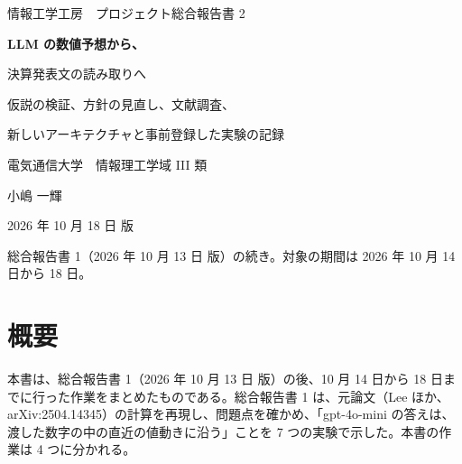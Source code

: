 \documentclass[xelatex,ja=standard,jafont=haranoaji,a4paper,10pt]{bxjsreport}
\begin{document}
\begin{titlepage}
\centering
\vspace*{30mm}
{\sffamily\Large 情報工学工房　プロジェクト総合報告書 2\par}
\vspace{14mm}
{\sffamily\bfseries\huge LLM の数値予想から、\par\vspace{3mm}決算発表文の読み取りへ\par}
\vspace{12mm}
{\large 仮説の検証、方針の見直し、文献調査、\par\vspace{2mm}新しいアーキテクチャと事前登録した実験の記録\par}
\vspace{30mm}
{\large 電気通信大学　情報理工学域 III 類\par}
\vspace{3mm}
{\Large 小嶋 一輝\par}
\vspace{20mm}
{\large 2026 年 10 月 18 日 版\par}
\vfill
{\small 総合報告書 1（2026 年 10 月 13 日 版）の続き。対象の期間は 2026 年 10 月 14 日から 18 日。\par}
\end{titlepage}
\hypersetup{pageanchor=true}

\chapter*{概要}

本書は、総合報告書 1（2026 年 10 月 13 日 版）の後、10 月 14 日から 18 日までに行った作業をまとめたものである。総合報告書 1 は、元論文（Lee ほか、arXiv:2504.14345）の計算を再現し、問題点を確かめ、「gpt-4o-mini の答えは、渡した数字の中の直近の値動きに沿う」ことを 7 つの実験で示した。本書の作業は 4 つに分かれる。
\end{document}
